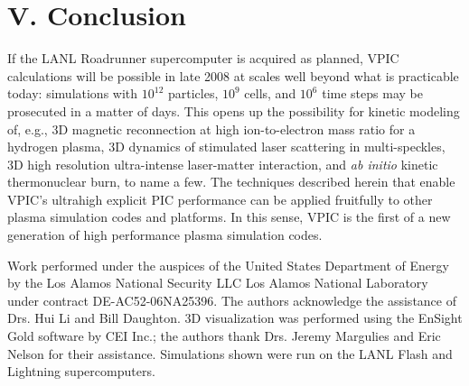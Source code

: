 \documentclass[aps,prl,preprint,preprintnumbers,groupedaddress]{revtex4}
\begin{document}
\section{V. Conclusion}

If the LANL Roadrunner supercomputer is acquired as planned, VPIC
calculations will be possible in late 2008 at scales well beyond what
is practicable today: simulations with $10^{12}$ particles, $10^9$
cells, and $10^6$ time steps may be prosecuted in a matter of days.
This opens up the possibility for kinetic modeling of, e.g., 3D
magnetic reconnection at high ion-to-electron mass ratio for a
hydrogen plasma, 3D dynamics of stimulated laser scattering in
multi-speckles, 3D high resolution ultra-intense laser-matter
interaction, and \textit{ab initio} kinetic thermonuclear burn, to
name a few.  The techniques described herein that enable VPIC's
ultrahigh explicit PIC performance can be applied fruitfully to other
plasma simulation codes and platforms.  In this sense, VPIC is the
first of a new generation of high performance plasma simulation codes.

\begin{acknowledgments}
Work performed under the auspices of the United States Department of
Energy by the Los Alamos National Security LLC Los Alamos National
Laboratory under contract DE-AC52-06NA25396.  The authors acknowledge
the assistance of Drs. Hui Li and Bill Daughton.  3D visualization was
performed using the EnSight Gold software by CEI Inc.; the authors
thank Drs. Jeremy Margulies and Eric Nelson for their assistance.
Simulations shown were run on the LANL Flash and Lightning
supercomputers.
\end{acknowledgments}


  
\end{document}
